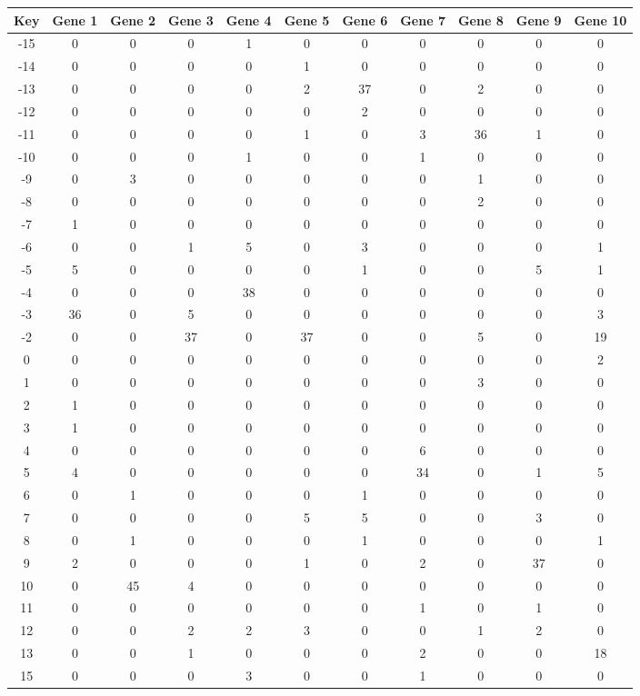 \begin{tabular}{|c|c|c|c|c|c|c|c|c|c|c|}
\hline
Key & Gene 1 & Gene 2 & Gene 3 & Gene 4 & Gene 5 & Gene 6 & Gene 7 & Gene 8 & Gene 9 & Gene 10 \\
\hline
-15 & 0 & 0 & 0 & 1 & 0 & 0 & 0 & 0 & 0 & 0 \\
-14 & 0 & 0 & 0 & 0 & 1 & 0 & 0 & 0 & 0 & 0 \\
-13 & 0 & 0 & 0 & 0 & 2 & 37 & 0 & 2 & 0 & 0 \\
-12 & 0 & 0 & 0 & 0 & 0 & 2 & 0 & 0 & 0 & 0 \\
-11 & 0 & 0 & 0 & 0 & 1 & 0 & 3 & 36 & 1 & 0 \\
-10 & 0 & 0 & 0 & 1 & 0 & 0 & 1 & 0 & 0 & 0 \\
-9 & 0 & 3 & 0 & 0 & 0 & 0 & 0 & 1 & 0 & 0 \\
-8 & 0 & 0 & 0 & 0 & 0 & 0 & 0 & 2 & 0 & 0 \\
-7 & 1 & 0 & 0 & 0 & 0 & 0 & 0 & 0 & 0 & 0 \\
-6 & 0 & 0 & 1 & 5 & 0 & 3 & 0 & 0 & 0 & 1 \\
-5 & 5 & 0 & 0 & 0 & 0 & 1 & 0 & 0 & 5 & 1 \\
-4 & 0 & 0 & 0 & 38 & 0 & 0 & 0 & 0 & 0 & 0 \\
-3 & 36 & 0 & 5 & 0 & 0 & 0 & 0 & 0 & 0 & 3 \\
-2 & 0 & 0 & 37 & 0 & 37 & 0 & 0 & 5 & 0 & 19 \\
0 & 0 & 0 & 0 & 0 & 0 & 0 & 0 & 0 & 0 & 2 \\
1 & 0 & 0 & 0 & 0 & 0 & 0 & 0 & 3 & 0 & 0 \\
2 & 1 & 0 & 0 & 0 & 0 & 0 & 0 & 0 & 0 & 0 \\
3 & 1 & 0 & 0 & 0 & 0 & 0 & 0 & 0 & 0 & 0 \\
4 & 0 & 0 & 0 & 0 & 0 & 0 & 6 & 0 & 0 & 0 \\
5 & 4 & 0 & 0 & 0 & 0 & 0 & 34 & 0 & 1 & 5 \\
6 & 0 & 1 & 0 & 0 & 0 & 1 & 0 & 0 & 0 & 0 \\
7 & 0 & 0 & 0 & 0 & 5 & 5 & 0 & 0 & 3 & 0 \\
8 & 0 & 1 & 0 & 0 & 0 & 1 & 0 & 0 & 0 & 1 \\
9 & 2 & 0 & 0 & 0 & 1 & 0 & 2 & 0 & 37 & 0 \\
10 & 0 & 45 & 4 & 0 & 0 & 0 & 0 & 0 & 0 & 0 \\
11 & 0 & 0 & 0 & 0 & 0 & 0 & 1 & 0 & 1 & 0 \\
12 & 0 & 0 & 2 & 2 & 3 & 0 & 0 & 1 & 2 & 0 \\
13 & 0 & 0 & 1 & 0 & 0 & 0 & 2 & 0 & 0 & 18 \\
15 & 0 & 0 & 0 & 3 & 0 & 0 & 1 & 0 & 0 & 0 \\
\hline
\end{tabular}